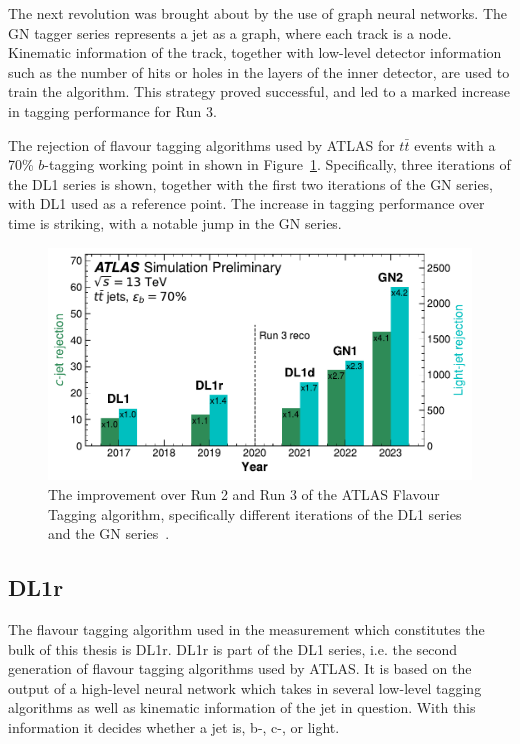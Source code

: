 \documentclass[10pt,a4paper]{book}
\begin{document}
The next revolution was brought about by the use of graph neural networks. The GN tagger series represents a jet as a graph, where each track is a node. Kinematic information of the track, together with low-level detector information such as the number of hits or holes in the layers of the inner detector, are used to train the algorithm. This strategy proved successful, and led to a marked increase in tagging performance for Run 3.

The rejection of flavour tagging algorithms used by ATLAS for $t\bar{t}$ events with a 70\% $b$-tagging working point in shown in Figure~\ref{fig:ftag_time}. Specifically, three iterations of the DL1 series is shown, together with the first two iterations of the GN series, with DL1 used as a reference point. The increase in tagging performance over time is striking, with a notable jump in the GN series. 

\begin{figure}
    \centering
    \includegraphics[width=0.8\linewidth]{atlas/ftag/ftag_time.pdf}
    \caption{The improvement over Run 2 and Run 3 of the ATLAS Flavour Tagging algorithm, specifically different iterations of the DL1 series and the GN series~\cite{Duperrin:2855275}.}
    \label{fig:ftag_time}
\end{figure}

\subsection{DL1r}

The flavour tagging algorithm used in the measurement which constitutes the bulk of this thesis is DL1r. DL1r is part of the DL1 series, i.e. the second generation of flavour tagging algorithms used by ATLAS. It is based on the output of a high-level neural network which takes in several low-level tagging algorithms as well as kinematic information of the jet in question. With this information it decides whether a jet is, b-, c-, or light.
\end{document}
